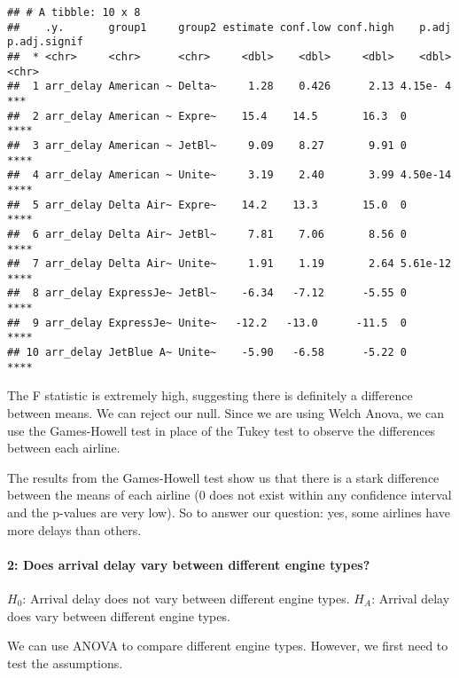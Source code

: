 \documentclass[
]{article}
\newenvironment{Shaded}{\begin{snugshade}}{\end{snugshade}}
\newcommand{\AttributeTok}[1]{\textcolor[rgb]{0.13,0.29,0.53}{#1}}
\newcommand{\FunctionTok}[1]{\textcolor[rgb]{0.13,0.29,0.53}{\textbf{#1}}}
\newcommand{\NormalTok}[1]{#1}
\newcommand{\OtherTok}[1]{\textcolor[rgb]{0.56,0.35,0.01}{#1}}
\newcommand{\SpecialCharTok}[1]{\textcolor[rgb]{0.81,0.36,0.00}{\textbf{#1}}}
\newcommand{\StringTok}[1]{\textcolor[rgb]{0.31,0.60,0.02}{#1}}
\begin{document}
\begin{verbatim}
## # A tibble: 10 x 8
##    .y.       group1     group2 estimate conf.low conf.high    p.adj p.adj.signif
##  * <chr>     <chr>      <chr>     <dbl>    <dbl>     <dbl>    <dbl> <chr>       
##  1 arr_delay American ~ Delta~     1.28    0.426      2.13 4.15e- 4 ***         
##  2 arr_delay American ~ Expre~    15.4    14.5       16.3  0        ****        
##  3 arr_delay American ~ JetBl~     9.09    8.27       9.91 0        ****        
##  4 arr_delay American ~ Unite~     3.19    2.40       3.99 4.50e-14 ****        
##  5 arr_delay Delta Air~ Expre~    14.2    13.3       15.0  0        ****        
##  6 arr_delay Delta Air~ JetBl~     7.81    7.06       8.56 0        ****        
##  7 arr_delay Delta Air~ Unite~     1.91    1.19       2.64 5.61e-12 ****        
##  8 arr_delay ExpressJe~ JetBl~    -6.34   -7.12      -5.55 0        ****        
##  9 arr_delay ExpressJe~ Unite~   -12.2   -13.0      -11.5  0        ****        
## 10 arr_delay JetBlue A~ Unite~    -5.90   -6.58      -5.22 0        ****
\end{verbatim}

The F statistic is extremely high, suggesting there is definitely a
difference between means. We can reject our null. Since we are using
Welch Anova, we can use the Games-Howell test in place of the Tukey test
to observe the differences between each airline.

The results from the Games-Howell test show us that there is a stark
difference between the means of each airline (0 does not exist within
any confidence interval and the p-values are very low). So to answer our
question: yes, some airlines have more delays than others.

\paragraph{2: Does arrival delay vary between different engine
types?}\label{does-arrival-delay-vary-between-different-engine-types}

\(H_0\): Arrival delay does not vary between different engine types.
\(H_A\): Arrival delay does vary between different engine types.

We can use ANOVA to compare different engine types. However, we first
need to test the assumptions.

\begin{Shaded}
\end{Shaded}
\end{document}
